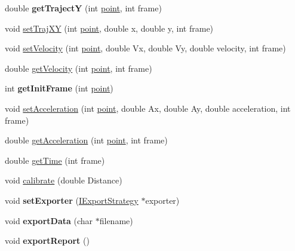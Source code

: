 \begin{DoxyCompactItemize}
\item 
\hypertarget{classmodel_1_1ProxyOpenCv_a16bb3cb81d0ee84485660b93813e8734}{
double {\bfseries getTrajectY} (int \hyperlink{structpoint}{point}, int frame)}
\label{classmodel_1_1ProxyOpenCv_a16bb3cb81d0ee84485660b93813e8734}

\item 
void \hyperlink{classmodel_1_1ProxyOpenCv_a688d218619840e6e119c067065f24894}{setTrajXY} (int \hyperlink{structpoint}{point}, double x, double y, int frame)
\item 
void \hyperlink{classmodel_1_1ProxyOpenCv_a4548eb046f62e2cec0f22b9be8caac9b}{setVelocity} (int \hyperlink{structpoint}{point}, double Vx, double Vy, double velocity, int frame)
\item 
double \hyperlink{classmodel_1_1ProxyOpenCv_afc76a6deab68b64e5b1b483359ba241f}{getVelocity} (int \hyperlink{structpoint}{point}, int frame)
\item 
\hypertarget{classmodel_1_1ProxyOpenCv_af57b65e3ff2c63c4fc1c48b807762d83}{
int {\bfseries getInitFrame} (int \hyperlink{structpoint}{point})}
\label{classmodel_1_1ProxyOpenCv_af57b65e3ff2c63c4fc1c48b807762d83}

\item 
void \hyperlink{classmodel_1_1ProxyOpenCv_aa77f6c6cda33e793243ebd1ac58fd846}{setAcceleration} (int \hyperlink{structpoint}{point}, double Ax, double Ay, double acceleration, int frame)
\item 
double \hyperlink{classmodel_1_1ProxyOpenCv_a0bc81e228590bf12ffa6a78595f0c2b5}{getAcceleration} (int \hyperlink{structpoint}{point}, int frame)
\item 
double \hyperlink{classmodel_1_1ProxyOpenCv_a24f5b1a14d2732d5dc41e42e4fa9cc43}{getTime} (int frame)
\item 
void \hyperlink{classmodel_1_1ProxyOpenCv_a40ea9e2ef388029a28f82afd8d50c9c4}{calibrate} (double Distance)
\item 
\hypertarget{classmodel_1_1ProxyOpenCv_a26ce82a3db6a539911d222cb6b0f6c92}{
void {\bfseries setExporter} (\hyperlink{classmodel_1_1IExportStrategy}{IExportStrategy} $\ast$exporter)}
\label{classmodel_1_1ProxyOpenCv_a26ce82a3db6a539911d222cb6b0f6c92}

\item 
\hypertarget{classmodel_1_1ProxyOpenCv_a9150fcba82459a59b03827ef26fb7330}{
void {\bfseries exportData} (char $\ast$filename)}
\label{classmodel_1_1ProxyOpenCv_a9150fcba82459a59b03827ef26fb7330}

\item 
\hypertarget{classmodel_1_1ProxyOpenCv_aa150e2c937f504f3a50ca7b61c8742a9}{
void {\bfseries exportReport} ()}
\label{classmodel_1_1ProxyOpenCv_aa150e2c937f504f3a50ca7b61c8742a9}


\end{DoxyCompactItemize}
